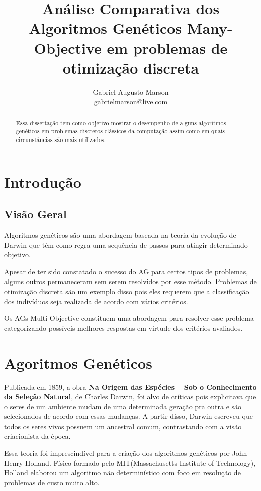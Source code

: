\documentclass[]{article}
\title{Análise Comparativa dos Algoritmos Genéticos Many-Objective em problemas de otimização discreta}
\author{Gabriel Augusto Marson\\ gabrielmarson@live.com }
\begin{document}
\maketitle

\begin{abstract}
	
	\noindent Essa dissertação tem como objetivo mostrar o desempenho de alguns algoritmos genéticos em problemas discretos clássicos da computação assim como em quais circunstâncias são mais utilizados.
	
\end{abstract}

\section{Introdução}

\subsection{Visão Geral}	

	Algoritmos genéticos são uma abordagem baseada na teoria da evolução de Darwin que têm como regra uma sequência de passos para atingir determinado objetivo.
	
	Apesar de ter sido constatado o sucesso do AG para certos tipos de problemas, alguns outros permaneceram sem serem resolvidos por esse método. Problemas de otimização discreta são um exemplo disso pois eles requerem que a classificação dos indivíduos seja realizada de acordo com vários critérios.
	
	Os AGs Multi-Objective constituem uma abordagem para resolver esse problema categorizando possíveis melhores respostas em virtude dos critérios avaliados.
	
	
\section{Agoritmos Genéticos}

	Publicada em 1859, a obra \textbf{Na Origem das Espécies – Sob o Conhecimento da Seleção Natural}, de Charles Darwin, foi alvo de críticas pois explicitava que o seres de um ambiente mudam de uma determinada geração pra outra e são selecionados de acordo com essas mudanças. A partir disso, Darwin escreveu que todos os seres vivos possuem um ancestral comum, contrastando com a visão criacionista da época.
	
	Essa teoria foi imprescindível para a criação dos algoritmos genéticos por John Henry Holland. Físico formado pelo MIT(Massachusetts Institute of Technology), Holland elaborou um algoritmo não determinístico com foco em resolução de problemas de custo muito alto.
	
\end{document}
